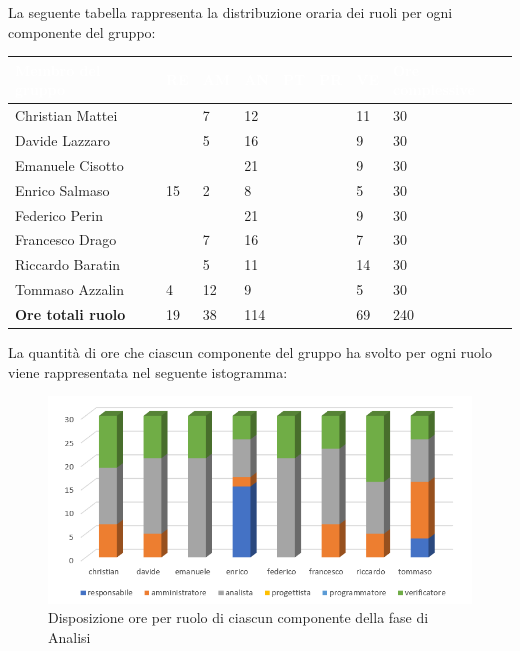 La seguente tabella rappresenta la distribuzione oraria dei ruoli per ogni componente del gruppo:
\renewcommand{\arraystretch}{2}
\begin{table}[h!]
\centering
\caption{Tabella della divisione oraria di Analisi}	
\begin{longtable} { C{4cm} C{1cm} C{1cm} C{1cm} C{1cm} C{1cm} C{1cm} C{3cm}}

	\textcolor{white}{\textbf{Membro del gruppo}} & 
	\textcolor{white}{\textbf{RE}} & 
	\textcolor{white}{\textbf{AM}} & 
	\textcolor{white}{\textbf{AN}} & 
	\textcolor{white}{\textbf{PT}} & 
	\textcolor{white}{\textbf{PR}} & 
	\textcolor{white}{\textbf{VE}} & 
	\textcolor{white}{\textbf{Ore complessive}}\\	
\endhead        

        Christian Mattei     &  & 7 & 12 &  & & 11 & 30 \\
		Davide Lazzaro       &  & 5 & 16 &  &  & 9 & 30 \\
        Emanuele Cisotto     &  &  & 21 &  &  & 9 & 30 \\
        Enrico Salmaso       & 15 & 2 & 8  &  &  & 5 & 30 \\
        Federico Perin       &  &  & 21 &  &  & 9 & 30 \\
        Francesco Drago      &  & 7 & 16 &  &  & 7 & 30 \\
        Riccardo Baratin     &  & 5 & 11 &  &  & 14 & 30 \\
        Tommaso Azzalin      & 4 & 12 & 9  &  &  & 5 & 30 \\
        \textbf{Ore totali ruolo} & 19 & 38 & 114 &  &  & 69 & 240 \\
        
\end{longtable}
\end{table}
\newline
La quantità di ore che ciascun componente del gruppo ha svolto per ogni ruolo viene rappresentata nel seguente istogramma:
\begin{figure}[h]
	\centering
	\caption{Disposizione ore per ruolo di ciascun componente della fase di Analisi}
	\includegraphics[scale=2.35]{sezioni/Istogrammi/IstogrammaAnalisi.png}
	
\end{figure}

